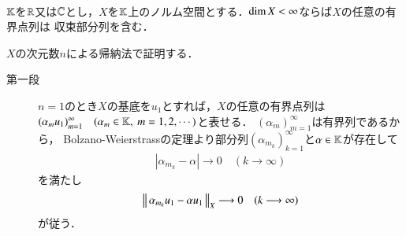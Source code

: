 	\begin{screen}
		\begin{thm}\mbox{}\\
			$\mathbb{K}$を$\mathbb{R}$又は$\mathbb{C}$とし，$X$を$\mathbb{K}$上のノルム空間とする．$\operatorname{dim} X < \infty$ならば$X$の任意の有界点列は
			収束部分列を含む．
			\label{thm:normed_space_locally_compact}
		\end{thm}
	\end{screen}

	\begin{prf}\mbox{}
		$X$の次元数$n$による帰納法で証明する．
		\begin{description}
			\item[第一段]
				$n=1$のとき$X$の基底を$u_1$とすれば，$X$の任意の有界点列は
				$( \alpha_m u_1)_{m=1}^{\infty} \quad (\alpha_m \in \mathbb{K},\ m=1,2,\cdots)$と表せる．
				$\left( \alpha_m \right)_{m=1}^{\infty}$は有界列であるから，
				Bolzano-Weierstrassの定理より部分列$\left( \alpha_{m_k} \right)_{k=1}^{\infty}$と$\alpha \in \mathbb{K}$が存在して
				\begin{align}
					\left| \alpha_{m_k} - \alpha \right| \longrightarrow 0 \quad (k \longrightarrow \infty)
				\end{align}
				を満たし
				\begin{align}
					\left\|\, \alpha_{m_k} u_1 - \alpha u_1\, \right\|_{X} \longrightarrow 0 \quad (k \longrightarrow \infty)
				\end{align}
				が従う．
			

\end{description}
\end{prf}
